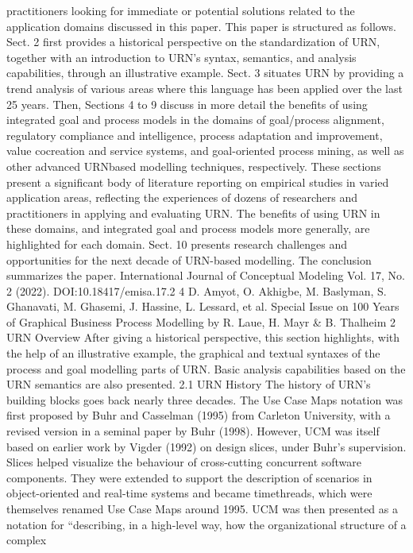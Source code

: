 practitioners looking for immediate or potential
solutions related to the application domains
discussed in this paper.
This paper is structured as follows. Sect. 2
first provides a historical perspective on the standardization of URN, together with an introduction
to URN’s syntax, semantics, and analysis capabilities, through an illustrative example. Sect. 3
situates URN by providing a trend analysis of various areas where this language has been applied
over the last 25 years. Then, Sections 4 to 9 discuss
in more detail the benefits of using integrated goal
and process models in the domains of goal/process
alignment, regulatory compliance and intelligence,
process adaptation and improvement, value cocreation and service systems, and goal-oriented
process mining, as well as other advanced URNbased modelling techniques, respectively. These
sections present a significant body of literature
reporting on empirical studies in varied application areas, reflecting the experiences of dozens
of researchers and practitioners in applying and
evaluating URN. The benefits of using URN in
these domains, and integrated goal and process
models more generally, are highlighted for each
domain. Sect. 10 presents research challenges and
opportunities for the next decade of URN-based
modelling. The conclusion summarizes the paper.
International Journal of Conceptual Modeling
Vol. 17, No. 2 (2022). DOI:10.18417/emisa.17.2
4 D. Amyot, O. Akhigbe, M. Baslyman, S. Ghanavati, M. Ghasemi, J. Hassine, L. Lessard, et al.
Special Issue on 100 Years of Graphical Business Process Modelling by R. Laue, H. Mayr & B. Thalheim
2 URN Overview
After giving a historical perspective, this section
highlights, with the help of an illustrative example,
the graphical and textual syntaxes of the process
and goal modelling parts of URN. Basic analysis
capabilities based on the URN semantics are also
presented.
2.1 URN History
The history of URN’s building blocks goes back
nearly three decades. The Use Case Maps notation
was first proposed by Buhr and Casselman (1995)
from Carleton University, with a revised version in
a seminal paper by Buhr (1998). However, UCM
was itself based on earlier work by Vigder (1992)
on design slices, under Buhr’s supervision. Slices
helped visualize the behaviour of cross-cutting
concurrent software components. They were extended to support the description of scenarios in
object-oriented and real-time systems and became
timethreads, which were themselves renamed Use
Case Maps around 1995. UCM was then presented
as a notation for “describing, in a high-level way,
how the organizational structure of a complex
